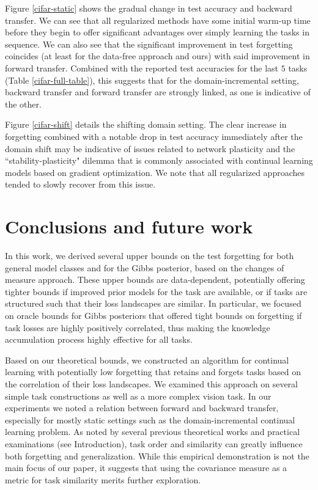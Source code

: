 \documentclass{article}
\theoremstyle{plain}
\theoremstyle{definition}
\theoremstyle{remark}
\begin{document}
Figure \ref{cifar-static} shows the gradual change in test accuracy and backward transfer. We can see that all regularized methods have some initial warm-up time before they begin to offer significant advantages over simply learning the tasks in sequence. We can also see that the significant improvement in test forgetting coincides (at least for the data-free approach and ours) with said improvement in forward transfer. Combined with the reported test accuracies for the last $5$ tasks (Table \ref{cifar-full-table}), this suggests that for the domain-incremental setting, backward transfer and forward transfer are strongly linked, as one is indicative of the other.

Figure \ref{cifar-shift} details the shifting domain setting. The clear increase in forgetting combined with a notable drop in test accuracy immediately after the domain shift may be indicative of issues related to network plasticity and the ``stability-plasticity" dilemma \citep{mirzadeh2020understanding} that is commonly associated with continual learning models based on gradient optimization. We note that all regularized approaches tended to slowly recover from this issue.

\section{Conclusions and future work}

In this work, we derived several upper bounds on the test forgetting for both general model classes and for the Gibbs posterior, based on the changes of measure approach.
These upper bounds are data-dependent, potentially offering tighter bounds if improved prior models for the task are available, or if tasks are structured such that their loss landscapes are similar. In particular, we focused on oracle bounds for Gibbs posteriors that offered tight bounds on forgetting if task losses are highly positively correlated, thus making the knowledge accumulation process highly effective for all tasks.

Based on our theoretical bounds, we constructed an algorithm for continual learning with potentially low forgetting that retains and forgets tasks based on the correlation of their loss landscapes. We examined this approach on several simple task constructions as well as a more complex vision task. In our experiments we noted a relation between forward and backward transfer, especially for mostly static settings such as the domain-incremental continual learning problem. As noted by several previous theoretical works and practical examinations (see Introduction), task order and similarity can greatly influence both forgetting and generalization. While this empirical demonstration is not the main focus of our paper, it suggests that using the covariance measure as a metric for task similarity merits further exploration.
\end{document}
